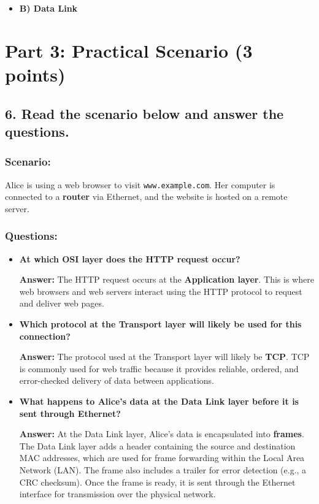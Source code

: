 \documentclass{article}
\begin{document}
\begin{itemize}
    \item \textbf{B) Data Link}
\end{itemize}

\section*{Part 3: Practical Scenario (3 points)}

\subsection*{6. Read the scenario below and answer the questions.}

\subsubsection*{Scenario:}
Alice is using a web browser to visit \texttt{www.example.com}. Her computer is connected to a \textbf{router} via Ethernet, and the website is hosted on a remote server.

\subsubsection*{Questions:}

\begin{itemize}
    \item \textbf{At which OSI layer does the HTTP request occur?}
    
    \textbf{Answer:} The HTTP request occurs at the \textbf{Application layer}. This is where web browsers and web servers interact using the HTTP protocol to request and deliver web pages.
    
    \item \textbf{Which protocol at the Transport layer will likely be used for this connection?}
    
    \textbf{Answer:} The protocol used at the Transport layer will likely be \textbf{TCP}. TCP is commonly used for web traffic because it provides reliable, ordered, and error-checked delivery of data between applications.
    
    \item \textbf{What happens to Alice's data at the Data Link layer before it is sent through Ethernet?}
    
    \textbf{Answer:} At the Data Link layer, Alice's data is encapsulated into \textbf{frames}. The Data Link layer adds a header containing the source and destination MAC addresses, which are used for frame forwarding within the Local Area Network (LAN). The frame also includes a trailer for error detection (e.g., a CRC checksum). Once the frame is ready, it is sent through the Ethernet interface for transmission over the physical network.
\end{itemize}
\end{document}
